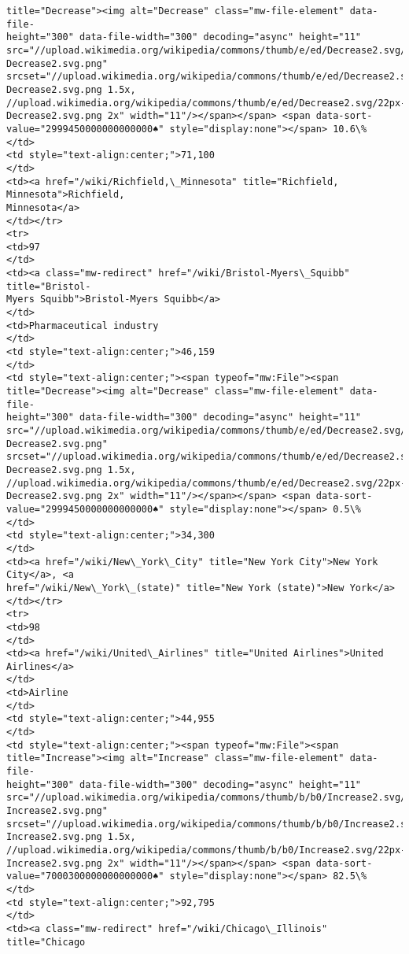 \documentclass[11pt]{article}
\begin{document}
\begin{Verbatim}[commandchars=\\\{\}]
title="Decrease"><img alt="Decrease" class="mw-file-element" data-file-
height="300" data-file-width="300" decoding="async" height="11"
src="//upload.wikimedia.org/wikipedia/commons/thumb/e/ed/Decrease2.svg/11px-
Decrease2.svg.png"
srcset="//upload.wikimedia.org/wikipedia/commons/thumb/e/ed/Decrease2.svg/17px-
Decrease2.svg.png 1.5x,
//upload.wikimedia.org/wikipedia/commons/thumb/e/ed/Decrease2.svg/22px-
Decrease2.svg.png 2x" width="11"/></span></span> <span data-sort-
value="2999450000000000000♠" style="display:none"></span> 10.6\%
</td>
<td style="text-align:center;">71,100
</td>
<td><a href="/wiki/Richfield,\_Minnesota" title="Richfield, Minnesota">Richfield,
Minnesota</a>
</td></tr>
<tr>
<td>97
</td>
<td><a class="mw-redirect" href="/wiki/Bristol-Myers\_Squibb" title="Bristol-
Myers Squibb">Bristol-Myers Squibb</a>
</td>
<td>Pharmaceutical industry
</td>
<td style="text-align:center;">46,159
</td>
<td style="text-align:center;"><span typeof="mw:File"><span
title="Decrease"><img alt="Decrease" class="mw-file-element" data-file-
height="300" data-file-width="300" decoding="async" height="11"
src="//upload.wikimedia.org/wikipedia/commons/thumb/e/ed/Decrease2.svg/11px-
Decrease2.svg.png"
srcset="//upload.wikimedia.org/wikipedia/commons/thumb/e/ed/Decrease2.svg/17px-
Decrease2.svg.png 1.5x,
//upload.wikimedia.org/wikipedia/commons/thumb/e/ed/Decrease2.svg/22px-
Decrease2.svg.png 2x" width="11"/></span></span> <span data-sort-
value="2999450000000000000♠" style="display:none"></span> 0.5\%
</td>
<td style="text-align:center;">34,300
</td>
<td><a href="/wiki/New\_York\_City" title="New York City">New York City</a>, <a
href="/wiki/New\_York\_(state)" title="New York (state)">New York</a>
</td></tr>
<tr>
<td>98
</td>
<td><a href="/wiki/United\_Airlines" title="United Airlines">United Airlines</a>
</td>
<td>Airline
</td>
<td style="text-align:center;">44,955
</td>
<td style="text-align:center;"><span typeof="mw:File"><span
title="Increase"><img alt="Increase" class="mw-file-element" data-file-
height="300" data-file-width="300" decoding="async" height="11"
src="//upload.wikimedia.org/wikipedia/commons/thumb/b/b0/Increase2.svg/11px-
Increase2.svg.png"
srcset="//upload.wikimedia.org/wikipedia/commons/thumb/b/b0/Increase2.svg/17px-
Increase2.svg.png 1.5x,
//upload.wikimedia.org/wikipedia/commons/thumb/b/b0/Increase2.svg/22px-
Increase2.svg.png 2x" width="11"/></span></span> <span data-sort-
value="7000300000000000000♠" style="display:none"></span> 82.5\%
</td>
<td style="text-align:center;">92,795
</td>
<td><a class="mw-redirect" href="/wiki/Chicago\_Illinois" title="Chicago

\end{Verbatim}
\end{document}

